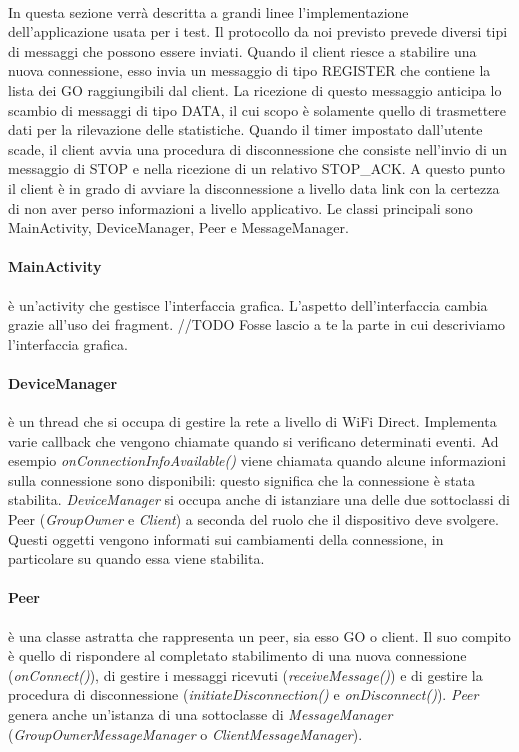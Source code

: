 \documentclass{llncs}
\begin{document}
\paragraph{} In questa sezione verrà descritta a grandi linee l'implementazione dell'applicazione usata per i test. Il protocollo da noi previsto prevede diversi tipi di messaggi che possono essere inviati. Quando il client 
riesce a stabilire una nuova connessione, esso invia un messaggio di tipo REGISTER che contiene la lista dei GO raggiungibili dal client. La ricezione di questo messaggio anticipa lo scambio di messaggi di tipo DATA, il cui scopo
è solamente quello di trasmettere dati per la rilevazione delle statistiche. Quando il timer impostato dall'utente scade, il client avvia una procedura di disconnessione che consiste nell'invio di un messaggio di STOP e nella ricezione 
di un relativo STOP\_ACK. A questo punto il client è in grado di avviare la disconnessione a livello data link con la certezza di non aver perso informazioni a livello applicativo.
Le classi principali sono MainActivity, DeviceManager, Peer e MessageManager.

\paragraph{MainActivity} è un'activity che gestisce l'interfaccia grafica. L'aspetto dell'interfaccia cambia grazie all'uso dei fragment.
//TODO Fosse lascio a te la parte in cui descriviamo l'interfaccia grafica.

\paragraph{DeviceManager} è un thread che si occupa di gestire la rete a livello di WiFi Direct. Implementa varie callback che vengono chiamate quando si verificano determinati eventi.
Ad esempio \emph{onConnectionInfoAvailable()} viene chiamata quando alcune informazioni sulla connessione sono disponibili: questo significa che la connessione è stata stabilita.
\emph{DeviceManager} si occupa anche di istanziare una delle due sottoclassi di Peer (\emph{GroupOwner} e \emph{Client}) a seconda del ruolo che il dispositivo deve svolgere. Questi oggetti vengono informati sui cambiamenti della connessione, in particolare su quando essa viene stabilita.

\paragraph{Peer} è una classe astratta che rappresenta un peer, sia esso GO o client. Il suo compito è quello di rispondere al completato stabilimento di una nuova connessione (\emph{onConnect()}), 
di gestire i messaggi ricevuti (\emph{receiveMessage()}) e di gestire la procedura di disconnessione (\emph{initiateDisconnection()} e \emph{onDisconnect()}). 
\emph{Peer} genera anche un'istanza di una sottoclasse di \emph{MessageManager} (\emph{GroupOwnerMessageManager} o \emph{ClientMessageManager}).
\end{document}
